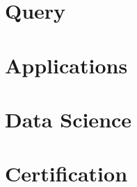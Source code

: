 % 


% 

% 

\section[Query]{Query}


\section[Apps]{Applications}


\section[DS]{Data Science}



\section[Cert]{Certification}


